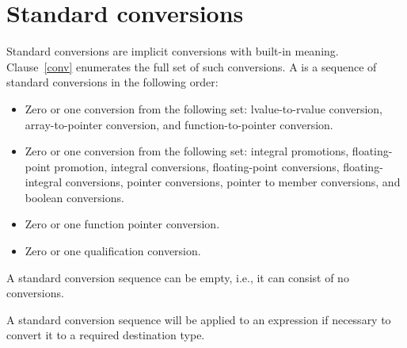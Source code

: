 \chapter[conv]{Standard conversions}

%

\pnum
{}%
%
Standard conversions are implicit conversions with built-in meaning.
Clause~\ref{conv} enumerates the full set of such conversions. A
%
 is a sequence of standard
conversions in the following order:

\begin{itemize}
\item Zero or one conversion from the following set: lvalue-to-rvalue
conversion, array-to-pointer conversion, and function-to-pointer
conversion.

\item Zero or one conversion from the following set: integral
promotions, floating-point promotion, integral conversions, floating-point
conversions, floating-integral conversions, pointer conversions,
pointer to member conversions, and boolean conversions.

\item Zero or one function pointer conversion.

\item Zero or one qualification conversion.
\end{itemize}

\begin{note}
A standard conversion sequence can be empty, i.e., it can consist of no
conversions. \end{note} A standard conversion sequence will be applied to
an expression if necessary to convert it to a required destination type.

